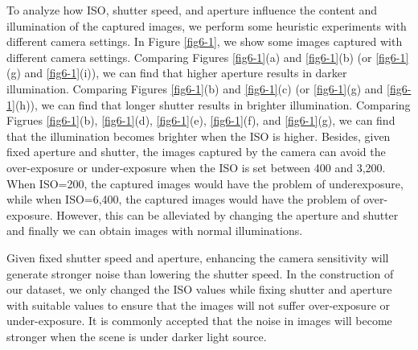 To analyze how ISO, shutter speed, and aperture influence the content and illumination of the captured images, we perform some heuristic experiments with different camera settings. In Figure \ref{fig6-1}, we show some images captured with different camera settings. Comparing Figures \ref{fig6-1}(a) and \ref{fig6-1}(b) (or \ref{fig6-1}(g) and \ref{fig6-1}(i)), we can find that higher aperture results in darker illumination. Comparing Figures \ref{fig6-1}(b) and \ref{fig6-1}(c) (or \ref{fig6-1}(g) and \ref{fig6-1}(h)), we can find that longer shutter results in brighter illumination. Comparing Figrues \ref{fig6-1}(b), \ref{fig6-1}(d), \ref{fig6-1}(e), \ref{fig6-1}(f), and \ref{fig6-1}(g), we can find that the illumination becomes brighter when the ISO is higher. Besides, given fixed aperture and shutter, the images captured by the camera can avoid the over-exposure or under-exposure when the ISO is set between 400 and 3,200. When ISO=200, the captured images would have the problem of underexposure, while when ISO=6,400, the captured images would have the problem of over-exposure. However, this can be alleviated by changing the aperture and shutter and finally we can obtain images with normal illuminations.

Given fixed shutter speed and aperture, enhancing the camera sensitivity will generate stronger noise than lowering the shutter speed. In the construction of our dataset, we only changed the ISO values while fixing shutter and aperture with suitable values to ensure that the images will not suffer over-exposure or under-exposure. It is commonly accepted that the noise in images will become stronger when the scene is under darker light source.



